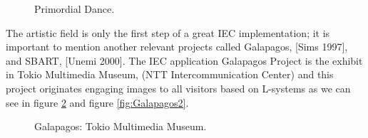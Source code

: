 \begin{figure}
\captionsetup{justification=centering,margin=2cm}
\centering
\setlength\fboxsep{0pt}
\setlength\fboxrule{0.7pt}
\caption{Primordial Dance.}
\label{fig:PrimordialD}       
\end{figure}


The artistic field is only the first step of a great IEC implementation; it is
important to mention another relevant projects called Galapagos, \cite{sims1997interactivity}[Sims 1997],
and SBART, \cite{unemi2000sbart} [Unemi 2000]. The IEC application Galapagos Project is the exhibit in
Tokio Multimedia Museum, (NTT Intercommunication Center) and this project
originates engaging images to all visitors based on L-systems as we can see in figure \ref{fig:Galapagos1} 
and figure \ref{fig:Galapagos2}.

\begin{figure}
\captionsetup{justification=centering,margin=2cm}
\centering
\setlength\fboxsep{0pt}
\setlength\fboxrule{0.7pt}
\caption{Galapagos: Tokio Multimedia Museum.}
\label{fig:Galapagos1}       
\end{figure}

